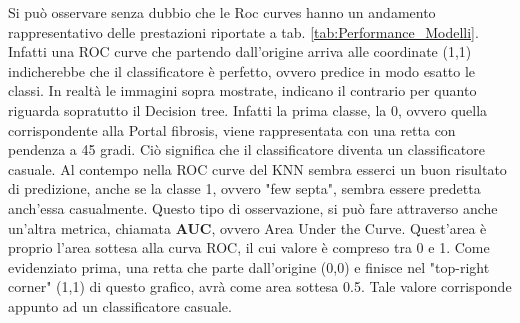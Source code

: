 Si può osservare senza dubbio che le Roc curves hanno un andamento rappresentativo delle prestazioni riportate a tab. \ref{tab:Performance_Modelli}. Infatti una ROC curve che partendo dall'origine arriva alle coordinate (1,1) indicherebbe che il classificatore è perfetto, ovvero predice in modo esatto le classi. In realtà le immagini sopra mostrate, indicano il contrario per quanto riguarda sopratutto il Decision tree. Infatti la prima classe, la 0, ovvero quella corrispondente alla Portal fibrosis, viene rappresentata con una retta con pendenza a 45 gradi. Ciò significa che il classificatore diventa un classificatore casuale. Al contempo nella ROC curve del KNN sembra esserci un buon risultato di predizione, anche se la classe 1, ovvero "few septa", sembra essere predetta anch'essa casualmente.
Questo tipo di osservazione, si può fare attraverso anche un'altra metrica, chiamata \textbf{AUC}, ovvero Area Under the Curve. Quest'area è proprio l'area sottesa alla curva ROC, il cui valore è compreso tra 0 e 1. Come evidenziato prima, una retta che parte dall'origine (0,0) e finisce nel "top-right corner" (1,1) di questo grafico, avrà come area sottesa 0.5. Tale valore corrisponde appunto ad un classificatore casuale.
\clearpage
